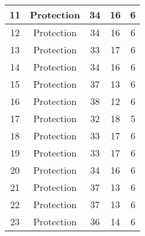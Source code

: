 \documentclass[results.tex]{subfiles}
\begin{document}
\begin{center}
\begin{tabular}{| c || c | c | c | c |}
            \hline
            11                      & Protection                   & 34                     & 16                      & 6                    \\
            \hline
            12                      & Protection                   & 34                     & 16                      & 6                    \\
            \hline
            13                      & Protection                   & 33                     & 17                      & 6                    \\
            \hline
            14                      & Protection                   & 34                     & 16                      & 6                    \\
            \hline
            15                      & Protection                   & 37                     & 13                      & 6                    \\
            \hline
            16                      & Protection                   & 38                     & 12                      & 6                    \\
            \hline
            17                      & Protection                   & 32                     & 18                      & 5                    \\
            \hline
            18                      & Protection                   & 33                     & 17                      & 6                    \\
            \hline
            19                      & Protection                   & 33                     & 17                      & 6                    \\
            \hline
            20                      & Protection                   & 34                     & 16                      & 6                    \\
            \hline
            21                      & Protection                   & 37                     & 13                      & 6                    \\
            \hline
            22                      & Protection                   & 37                     & 13                      & 6                    \\
            \hline
            23                      & Protection                   & 36                     & 14                      & 6                    \\

\end{tabular}
\end{center}
\end{document}
